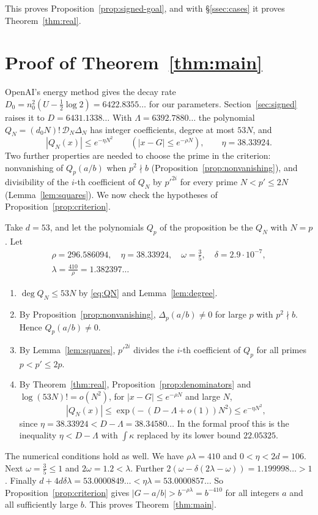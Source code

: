 \documentclass[11pt]{amsart}
\newcommand{\Rho}{296.586094}
\newcommand{\EtaTot}{38.33924}
\newcommand{\LamCrit}{1.382397}
\newcommand{\Decay}{6431.1338}
\newcommand{\DecayOA}{6422.8355}
\newcommand{\EtaExact}{38.34580}
\newcommand{\PayL}{53.0000849}
\newcommand{\PayR}{53.0000857}
\newcommand{\ChiLean}{22.05325}
\newcommand{\LamDen}{6392.7880}
\theoremstyle{definition}
\theoremstyle{remark}
\numberwithin{equation}{section}
\newcommand{\cD}{\mathcal D}
\begin{document}
This proves Proposition~\ref{prop:signed-goal}, and with \S\ref{ssec:cases} it proves Theorem~\ref{thm:real}.
\section{Proof of Theorem~\ref{thm:main}}\label{sec:proof}

OpenAI's energy method gives the decay rate $D_0=n_0^2(U-\frac12\log2)=\DecayOA\ldots$ for our parameters.
Section~\ref{sec:signed} raises it to $D=\Decay\ldots$ With $\Lambda=\LamDen\ldots$ the polynomial
$Q_N=(d_0N)!\,\cD_N\Delta_N$ has integer coefficients, degree at most $53N$, and
\[
 |Q_N(x)|\le e^{-\eta N^2}\qquad(|x-G|\le e^{-\rho N}),\qquad \eta=\EtaTot .
\]
Two further properties are needed to choose the prime in the criterion: nonvanishing of $Q_p(a/b)$ when
$p^2\nmid b$ (Proposition~\ref{prop:nonvanishing}), and divisibility of the $i$-th coefficient of $Q_N$ by
$p'^{2i}$ for every prime $N<p'\le2N$ (Lemma~\ref{lem:squares}). We now check the hypotheses of
Proposition~\ref{prop:criterion}.

Take $d=53$, and let the polynomials $Q_p$ of the proposition be the $Q_N$ with $N=p$. Let
\begin{gather*}
 \rho=\Rho,\quad \eta=\EtaTot,\quad \omega=\tfrac35,\quad \delta=2.9\cdot10^{-7},\\
 \lambda=\frac{410}{\rho}=\LamCrit\ldots
\end{gather*}
\begin{enumerate}[label=(\alph*)]
\item $\deg Q_N\le53N$ by \eqref{eq:QN} and Lemma~\ref{lem:degree}.
\item By Proposition~\ref{prop:nonvanishing}, $\Delta_p(a/b)\ne0$ for large $p$ with $p^2\nmid b$. Hence
$Q_p(a/b)\ne0$.
\item By Lemma~\ref{lem:squares}, $p'^{2i}$ divides the $i$-th coefficient of $Q_p$ for all primes
$p<p'\le2p$.
\item By Theorem~\ref{thm:real}, Proposition~\ref{prop:denominators} and $\log(53N)!=o(N^2)$, for
$|x-G|\le e^{-\rho N}$ and large $N$,
\[
 |Q_N(x)|\le\exp\bigl(-(D-\Lambda+o(1))N^2\bigr)\le e^{-\eta N^2},
\]
since $\eta=\EtaTot<D-\Lambda=\EtaExact\ldots$ In the formal proof this is the inequality $\eta<D-\Lambda$ with
$\int\kappa$ replaced by its lower bound $\ChiLean$.
\end{enumerate}
The numerical conditions hold as well. We have $\rho\lambda=410$ and $0<\eta<2d=106$. Next $\omega=\frac35\le1$ and
$2\omega=1.2<\lambda$. Further $2(\omega-\delta(2\lambda-\omega))=1.199998\ldots>1$. Finally
$d+4d\delta\lambda=\PayL\ldots<\eta\lambda=\PayR\ldots$ So Proposition~\ref{prop:criterion} gives
$|G-a/b|>b^{-\rho\lambda}=b^{-410}$ for all integers $a$ and all sufficiently large $b$. This proves
Theorem~\ref{thm:main}.
\end{document}
